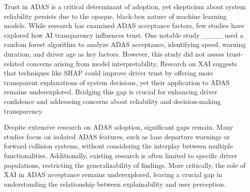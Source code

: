 Trust in ADAS is a critical determinant of adoption, yet skepticism about system reliability persists due to the opaque, black-box nature of machine learning models. While research has examined ADAS acceptance factors, few studies have explored how AI transparency influences trust. One notable study ____ used a random forest algorithm to analyze ADAS acceptance, identifying speed, warning duration, and driver age as key factors. However, this study did not assess trust-related concerns arising from model interpretability. Research on XAI suggests that techniques like SHAP could improve driver trust by offering more transparent explanations of system decisions, yet their application to ADAS remains underexplored. Bridging this gap is crucial for enhancing driver confidence and addressing concerns about reliability and decision-making transparency.

Despite extensive research on ADAS adoption, significant gaps remain. Many studies focus on isolated ADAS features, such as lane departure warnings or forward collision systems, without considering the interplay between multiple functionalities. Additionally, existing research is often limited to specific driver populations, restricting the generalizability of findings. More critically, the role of XAI in ADAS acceptance remains underexplored, leaving a crucial gap in understanding the relationship between explainability and user perception.